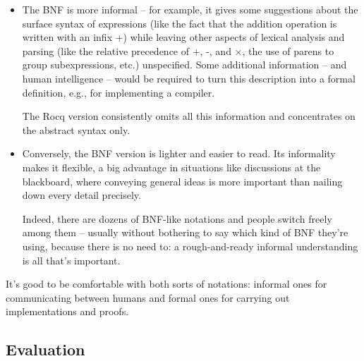 \documentclass[12pt]{report}
\begin{document}
\begin{itemize}
\item  The BNF is more informal -- for example, it gives some
         suggestions about the surface syntax of expressions (like the
         fact that the addition operation is written with an infix
         +) while leaving other aspects of lexical analysis and
         parsing (like the relative precedence of +, -, and \ensuremath{\times},
         the use of parens to group subexpressions, etc.)
         unspecified.  Some additional information -- and human
         intelligence -- would be required to turn this description
         into a formal definition, e.g., for implementing a compiler.


         The Rocq version consistently omits all this information and
         concentrates on the abstract syntax only.



\item  Conversely, the BNF version is lighter and easier to read.
         Its informality makes it flexible, a big advantage in
         situations like discussions at the blackboard, where
         conveying general ideas is more important than nailing down
         every detail precisely.


         Indeed, there are dozens of BNF-like notations and people
         switch freely among them -- usually without bothering to say
         which kind of BNF they're using, because there is no need to:
         a rough-and-ready informal understanding is all that's
         important.

\end{itemize}


    It's good to be comfortable with both sorts of notations: informal
    ones for communicating between humans and formal ones for carrying
    out implementations and proofs. 
\begin{coqdoccode}
\coqdocemptyline
\end{coqdoccode}
\subsection{Evaluation}
\end{document}
